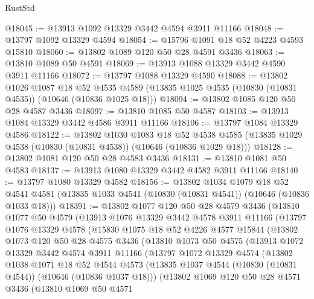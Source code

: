 \begin{lexlean}{RustStd}
\begin{coremodule}
@18045 := @13913 @1092 @13329 @3442 @4594 @3911 @11166
@18048 := @13797 @1092 @13329 @4594
@18054 := @15796 @1091 @18 @52 @4223 @4593 @15810
@18060 := @13802 @1089 @120 @50 @28 @4591 @3436
@18063 := @13810 @1089 @50 @4591
@18069 := @13913 @1088 @13329 @3442 @4590 @3911 @11166
@18072 := @13797 @1088 @13329 @4590
@18088 := @13802
    @1026
    @1087
    @18
    @52
    @4535
    @4589
    (@13835 @1025 @4535 (@10830 (@10831 @4535)) (@10646 (@10836 @1025 @18)))
@18094 := @13802 @1085 @120 @50 @28 @4587 @3436
@18097 := @13810 @1085 @50 @4587
@18103 := @13913 @1084 @13329 @3442 @4586 @3911 @11166
@18106 := @13797 @1084 @13329 @4586
@18122 := @13802
    @1030
    @1083
    @18
    @52
    @4538
    @4585
    (@13835 @1029 @4538 (@10830 (@10831 @4538)) (@10646 (@10836 @1029 @18)))
@18128 := @13802 @1081 @120 @50 @28 @4583 @3436
@18131 := @13810 @1081 @50 @4583
@18137 := @13913 @1080 @13329 @3442 @4582 @3911 @11166
@18140 := @13797 @1080 @13329 @4582
@18156 := @13802
    @1034
    @1079
    @18
    @52
    @4541
    @4581
    (@13835 @1033 @4541 (@10830 (@10831 @4541)) (@10646 (@10836 @1033 @18)))
@18391 := @13802
    @1077
    @120
    @50
    @28
    @4579
    @3436
    (@13810
      @1077
      @50
      @4579
      (@13913
        @1076
        @13329
        @3442
        @4578
        @3911
        @11166
        (@13797
          @1076
          @13329
          @4578
          (@15830
            @1075
            @18
            @52
            @4226
            @4577
            @15844
            (@13802
              @1073
              @120
              @50
              @28
              @4575
              @3436
              (@13810
                @1073
                @50
                @4575
                (@13913
                  @1072
                  @13329
                  @3442
                  @4574
                  @3911
                  @11166
                  (@13797
                    @1072
                    @13329
                    @4574
                    (@13802
                      @1038
                      @1071
                      @18
                      @52
                      @4544
                      @4573
                      (@13835 @1037 @4544 (@10830 (@10831 @4544)) (@10646 (@10836 @1037 @18)))
                      (@13802
                        @1069
                        @120
                        @50
                        @28
                        @4571
                        @3436
                        (@13810
                          @1069
                          @50
                          @4571

\end{coremodule}
\end{lexlean}
